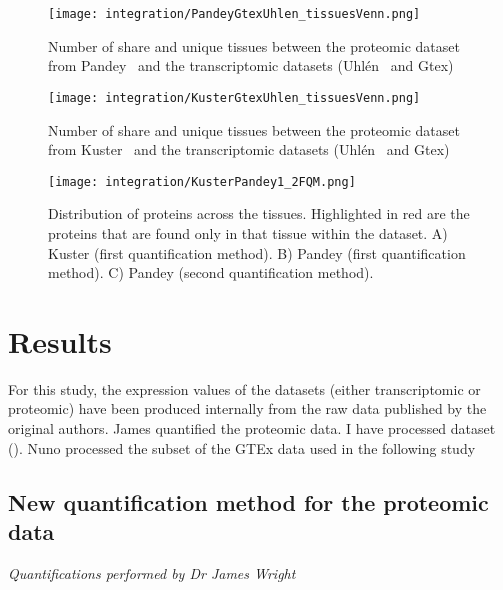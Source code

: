\begin{figure}
    \texttt{[image: integration/PandeyGtexUhlen\_tissuesVenn.png]}\centering
    \caption{\label{VennTissuePandeyGtexUhlen}Number of share and unique
    tissues between the proteomic dataset
    from Pandey \etal\ and the transcriptomic datasets (Uhlén \etal\ and Gtex)}
\end{figure}

\begin{figure}
    \texttt{[image: integration/KusterGtexUhlen\_tissuesVenn.png]}\centering
    \caption{\label{VennTissueKusterGtexUhlen}Number of share and unique
    tissues between the proteomic dataset
    from Kuster \etal\ and the transcriptomic datasets (Uhlén \etal\ and Gtex)}
\end{figure}


\begin{figure}
    \texttt{[image: integration/KusterPandey1\_2FQM.png]}\centering
    \caption{\label{KusterPandeyFQM}Distribution of proteins across the tissues.
    Highlighted in red are the proteins that are found only in that
    tissue within the dataset. A) Kuster (first quantification method).
    B) Pandey (first quantification method).
    C) Pandey (second quantification method).}
\end{figure}



\section{Results}\raggedbottom
\label{sec:IntegrationResults}

For this study, the expression values of the datasets (either transcriptomic or
proteomic) have been produced internally from the raw data published by the
original authors. James quantified the proteomic data.  I have processed
 dataset (\Rnaseq). Nuno processed the subset
of the GTEx data used in the following study 


\subsection{New quantification method for the proteomic data}
\label{subsec:IntegrationNewMethQuant}\raggedbottom

\textit{Quantifications performed by Dr James Wright}

